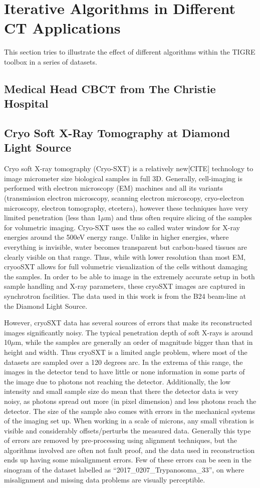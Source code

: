\FloatBarrier
\section{Iterative Algorithms in Different CT Applications}
This section tries to illustrate the effect of different algorithms within the TIGRE toolbox in a series of datasets. 
\subsection{Medical Head CBCT from  The Christie Hospital}
\subsection{Cryo Soft X-Ray Tomography at Diamond Light Source}

Cryo soft X-ray tomography (Cryo-SXT) is a relatively new[CITE] technology to image micrometer size biological samples in full 3D. Generally, cell-imaging is performed with electron microscopy (EM) machines and all its variants (transmission electron microscopy, scanning electron microscopy, cryo-electron microscopy, electron tomography, etcetera), however these techniques have very limited penetration (less than 1$\mu$m) and thus often require slicing of the samples for volumetric imaging. Cryo-SXT uses the so called water window for X-ray energies around the 500eV energy range. Unlike in higher energies, where everything is invisible, water becomes transparent but carbon-based tissues are clearly visible on that range. Thus, while with lower resolution than most EM, cryooSXT allows for full volumetric visualization of the cells without damaging the samples. In order to be able to image in the extremely accurate setup in both sample handling and X-ray parameters, these cryoSXT images are captured in synchrotron facilities. The data used in this work is from the B24 beam-line at the Diamond Light Source.

However, cryoSXT data has several sources of errors that make its reconstructed images significantly noisy. The typical penetration depth of soft X-rays is around 10$\mu$m, while the samples are generally an order of magnitude bigger than that in height and width. Thus cryoSXT is a limited angle problem, where most of the datasets are sampled over a 120 degrees arc. In the extrema of this range, the images in the detector tend to have little or none information in some parts of the image due to photons not reaching the detector. Additionally, the low intensity and small sample size do mean that there the detector data is very noisy, as photons spread out more (in pixel dimension) and less photons reach the detector. The size of the sample also comes with errors in the mechanical systems of the imaging set up. When working in a scale of microns, any small vibration is visible and considerably offsets/perturbs the measured data. Generally this type of errors are removed by pre-processing using alignment techniques, but the algorithms involved are often not fault proof, and the data used in reconstruction ends up having some misalignment errors. Few of these errors can be seen in the sinogram of the dataset labelled as ``2017\_0207\_Trypanosoma\_33'', on where misalignment and missing data problems are visually perceptible.


